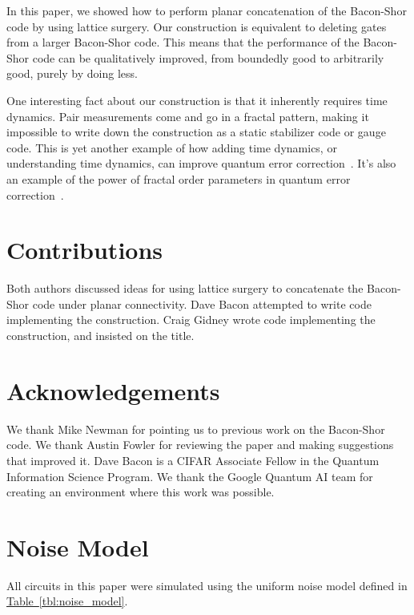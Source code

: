 \documentclass[onecolumn,unpublished,a4paper]{quantumarticle}
\theoremstyle{definition}
\theoremstyle{definition}
\theoremstyle{definition}
\newcommand{\tbl}[1]{\hyperref[tbl:#1]{Table~\ref*{tbl:#1}}}
\begin{document}
In this paper, we showed how to perform planar concatenation of the Bacon-Shor code by using lattice surgery.
Our construction is equivalent to deleting gates from a larger Bacon-Shor code.
This means that the performance of the Bacon-Shor code can be qualitatively improved, from boundedly good to arbitrarily good, purely by doing less.

One interesting fact about our construction is that it inherently requires time dynamics.
Pair measurements come and go in a fractal pattern, making it impossible to write down the construction as a static stabilizer code or gauge code.
This is yet another example of how adding time dynamics, or understanding time dynamics, can improve quantum error correction~\cite{hastings2021dynamically,mcewen2023relaxingsurface}.
It's also an example of the power of fractal order parameters in quantum error correction~\cite{yoshida2013exotic}.

\section{Contributions}

Both authors discussed ideas for using lattice surgery to concatenate the Bacon-Shor code under planar connectivity.
Dave Bacon attempted to write code implementing the construction.
Craig Gidney wrote code implementing the construction, and insisted on the title.

\section{Acknowledgements}

We thank Mike Newman for pointing us to previous work on the Bacon-Shor code.
We thank Austin Fowler for reviewing the paper and making suggestions that improved it.  Dave Bacon is a CIFAR Associate Fellow in the Quantum Information Science Program.
We thank the Google Quantum AI team for creating an environment where this work was possible.


\printbibliography

\clearpage
\appendix

\section{Noise Model}
\label{app:noise_model}

All circuits in this paper were simulated using the uniform noise model defined in \tbl{noise_model}.
\end{document}

